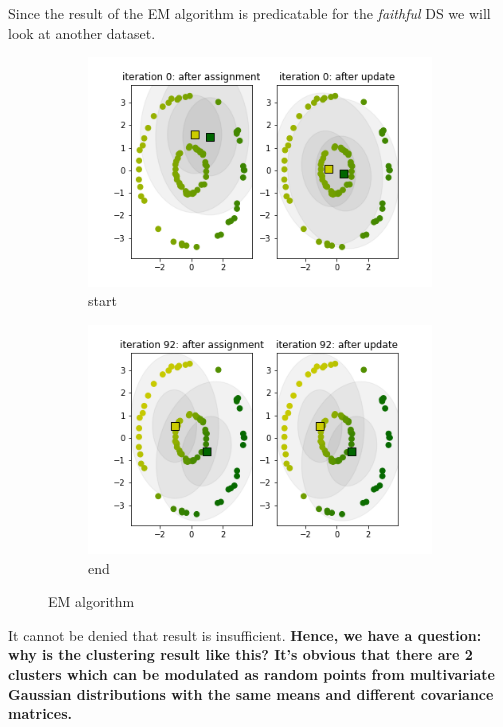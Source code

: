 \documentclass{homework}
\begin{document}
Since the result of the EM algorithm is predicatable for the \emph{faithful} DS we will look at another dataset.
\begin{figure}[hbt!]
     \centering
     \begin{subfigure}[b]{0.6\textwidth}
         \centering
         \includegraphics[width=\textwidth]{EM_visualization_0.png}
         \caption{start}
     \end{subfigure}
     \hfill
     \begin{subfigure}[b]{0.6\textwidth}
         \centering
         \includegraphics[width=\textwidth]{EM_visualization_92.png}
         \caption{end}
     \end{subfigure}
        \caption{EM algorithm}
\end{figure}

It cannot be denied that result is insufficient. \textbf{Hence, we have a question: why is the clustering result like this? It's obvious that there are 2 clusters which can be modulated as random points from multivariate Gaussian distributions with the same means and different covariance matrices.}
\end{document}

